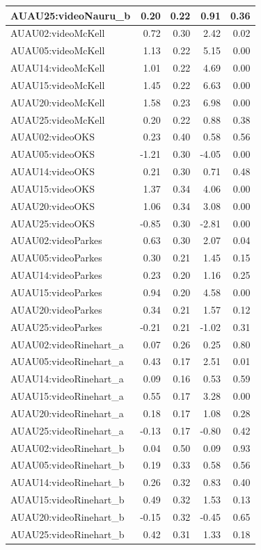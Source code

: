 \documentclass{monashthesis}
\begin{document}
\begin{tabular}{l|r|r|r|r}
\hline
AUAU25:videoNauru\_b & 0.20 & 0.22 & 0.91 & 0.36\\
\hline
AUAU02:videoMcKell & 0.72 & 0.30 & 2.42 & 0.02\\
\hline
AUAU05:videoMcKell & 1.13 & 0.22 & 5.15 & 0.00\\
\hline
AUAU14:videoMcKell & 1.01 & 0.22 & 4.69 & 0.00\\
\hline
AUAU15:videoMcKell & 1.45 & 0.22 & 6.63 & 0.00\\
\hline
AUAU20:videoMcKell & 1.58 & 0.23 & 6.98 & 0.00\\
\hline
AUAU25:videoMcKell & 0.20 & 0.22 & 0.88 & 0.38\\
\hline
AUAU02:videoOKS & 0.23 & 0.40 & 0.58 & 0.56\\
\hline
AUAU05:videoOKS & -1.21 & 0.30 & -4.05 & 0.00\\
\hline
AUAU14:videoOKS & 0.21 & 0.30 & 0.71 & 0.48\\
\hline
AUAU15:videoOKS & 1.37 & 0.34 & 4.06 & 0.00\\
\hline
AUAU20:videoOKS & 1.06 & 0.34 & 3.08 & 0.00\\
\hline
AUAU25:videoOKS & -0.85 & 0.30 & -2.81 & 0.00\\
\hline
AUAU02:videoParkes & 0.63 & 0.30 & 2.07 & 0.04\\
\hline
AUAU05:videoParkes & 0.30 & 0.21 & 1.45 & 0.15\\
\hline
AUAU14:videoParkes & 0.23 & 0.20 & 1.16 & 0.25\\
\hline
AUAU15:videoParkes & 0.94 & 0.20 & 4.58 & 0.00\\
\hline
AUAU20:videoParkes & 0.34 & 0.21 & 1.57 & 0.12\\
\hline
AUAU25:videoParkes & -0.21 & 0.21 & -1.02 & 0.31\\
\hline
AUAU02:videoRinehart\_a & 0.07 & 0.26 & 0.25 & 0.80\\
\hline
AUAU05:videoRinehart\_a & 0.43 & 0.17 & 2.51 & 0.01\\
\hline
AUAU14:videoRinehart\_a & 0.09 & 0.16 & 0.53 & 0.59\\
\hline
AUAU15:videoRinehart\_a & 0.55 & 0.17 & 3.28 & 0.00\\
\hline
AUAU20:videoRinehart\_a & 0.18 & 0.17 & 1.08 & 0.28\\
\hline
AUAU25:videoRinehart\_a & -0.13 & 0.17 & -0.80 & 0.42\\
\hline
AUAU02:videoRinehart\_b & 0.04 & 0.50 & 0.09 & 0.93\\
\hline
AUAU05:videoRinehart\_b & 0.19 & 0.33 & 0.58 & 0.56\\
\hline
AUAU14:videoRinehart\_b & 0.26 & 0.32 & 0.83 & 0.40\\
\hline
AUAU15:videoRinehart\_b & 0.49 & 0.32 & 1.53 & 0.13\\
\hline
AUAU20:videoRinehart\_b & -0.15 & 0.32 & -0.45 & 0.65\\
\hline
AUAU25:videoRinehart\_b & 0.42 & 0.31 & 1.33 & 0.18\\
\hline
\end{tabular}

\printbibliography[heading=bibintoc]
\end{document}
